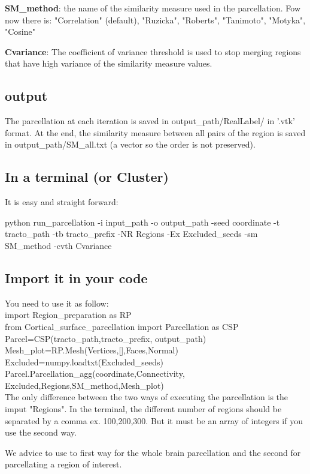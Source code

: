 \documentclass[a4paper,10pt]{article}
\begin{document}
\noindent \textbf{SM\_method}: the name of the similarity measure used in the parcellation. Fow now there is: "Correlation" (default), "Ruzicka", "Roberts", "Tanimoto", "Motyka", "Cosine"

\noindent \textbf{Cvariance}: The coefficient of variance threshold is used to stop merging regions that have high variance of the similarity measure values. 
\subsection{output}
The parcellation at each iteration is saved in output\_path/RealLabel/ in '.vtk' format. At the end, the similarity measure between all pairs of the region is saved in output\_path/SM\_all.txt (a vector so the order is not preserved). 

\subsection{In a terminal (or Cluster)}
It is easy and straight forward: 

\noindent python run\_parcellation -i input\_path -o output\_path -seed coordinate -t tracto\_path -tb tracto\_prefix -NR Regions -Ex Excluded\_seeds -sm SM\_method -cvth Cvariance

\subsection{Import it in your code}
You need to use it as follow:\\
import Region\_preparation as RP \\
from Cortical\_surface\_parcellation import Parcellation as CSP \\
Parcel=CSP(tracto\_path,tracto\_prefix, output\_path)\\
Mesh\_plot=RP.Mesh(Vertices,[],Faces,Normal)\\
Excluded=numpy.loadtxt(Excluded\_seeds)\\
Parcel.Parcellation\_agg(coordinate,Connectivity, Excluded,Regions,SM\_method,Mesh\_plot)\\

\noindent The only difference between the two ways of executing the parcellation is the imput "Regions". In the terminal, the different number of regions should be separated by a comma  ex. 100,200,300. But it must be an array of integers if you use the second way.

\noindent We advice to use to first way for the whole brain parcellation and the second for parcellating a region of interest.
\end{document}
